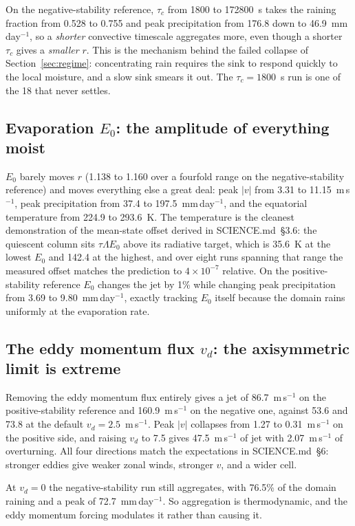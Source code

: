 \documentclass[11pt]{article}
\newcommand{\mmday}{mm\,day$^{-1}$}
\newcommand{\ms}{m\,s$^{-1}$}
\begin{document}
On the negative-stability reference, $\tau_c$ from 1800 to 172800~s takes the
raining fraction from 0.528 to 0.755 and peak precipitation from 176.8 down to
46.9~\mmday, so a \emph{shorter} convective timescale aggregates more, even
though a shorter $\tau_c$ gives a \emph{smaller} $r$. This is the mechanism
behind the failed collapse of Section~\ref{sec:regime}: concentrating rain
requires the sink to respond quickly to the local moisture, and a slow sink
smears it out. The $\tau_c = 1800$~s run is one of the 18 that never settles.

\subsection{Evaporation $E_0$: the amplitude of everything moist}

$E_0$ barely moves $r$ (1.138 to 1.160 over a fourfold range on the
negative-stability reference) and moves everything else a great deal: peak $|v|$
from 3.31 to 11.15~\ms, peak precipitation from 37.4 to 197.5~\mmday, and the
equatorial temperature from 224.9 to 293.6~K. The temperature is the cleanest
demonstration of the mean-state offset derived in SCIENCE.md~\S3.6: the quiescent
column sits $\tau\Lambda E_0$ above its radiative target, which is 35.6~K at the
lowest $E_0$ and 142.4 at the highest, and over eight runs spanning that range
the measured offset matches the prediction to $4\times10^{-7}$ relative. On the
positive-stability reference $E_0$ changes the jet by
1\% while changing peak precipitation from 3.69 to 9.80~\mmday, exactly tracking
$E_0$ itself because the domain rains uniformly at the evaporation rate.

\subsection{The eddy momentum flux $v_d$: the axisymmetric limit is extreme}

Removing the eddy momentum flux entirely gives a jet of 86.7~\ms{} on the
positive-stability reference and 160.9~\ms{} on the negative one, against 53.6
and 73.8 at the default $v_d = 2.5$~\ms. Peak $|v|$ collapses from 1.27 to
0.31~\ms{} on the positive side, and raising $v_d$ to 7.5 gives 47.5~\ms{} of jet
with 2.07~\ms{} of overturning. All four directions match the expectations in
SCIENCE.md~\S6: stronger eddies give weaker zonal winds, stronger $v$, and a
wider cell.

At $v_d = 0$ the negative-stability run still aggregates, with 76.5\% of the
domain raining and a peak of 72.7~\mmday. So aggregation is thermodynamic, and
the eddy momentum forcing modulates it rather than causing it.
\end{document}
